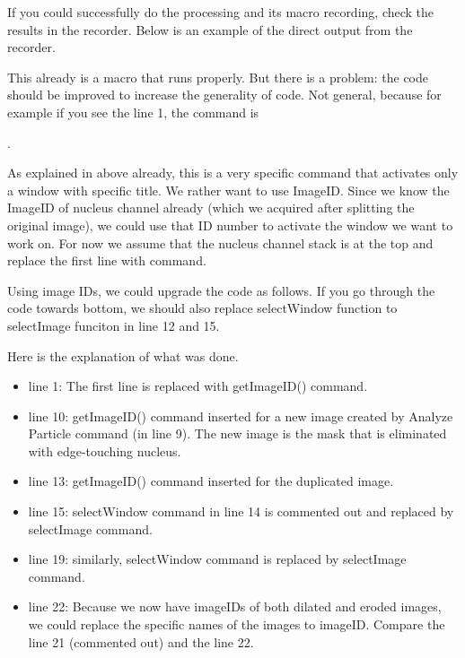 If you could successfully do the processing and its macro recording, check the results in the recorder. Below is an example of the direct output from the recorder. 



This already is a macro that runs properly. But there is a problem: the code should be improved to increase the generality of code. Not general, because for example if you see the line 1, the command is 

. 


As explained in above already, this is a very specific command that activates only a window with specific title. We rather want to use ImageID. Since we know the ImageID of nucleus channel already (which we acquired after splitting the original image), we could use that ID number to activate the window we want to work on. For now we assume that the nucleus channel stack is at the top and replace the first line with  command. 

Using image IDs, we could upgrade the code as follows.  If you go through the code towards bottom, we should also replace selectWindow function to selectImage funciton in line 12 and 15.




Here is the explanation of what was done. 
\begin{itemize}
  \item line 1: The first line is replaced with getImageID() command. 
  \item line 10: getImageID() command inserted for a new image created by Analyze Particle command (in line 9). The new image is the mask that is eliminated with edge-touching nucleus. 
  \item line 13: getImageID() command inserted for the duplicated image. 
  \item line 15: selectWindow command in line 14 is commented out and replaced by selectImage command. 
  \item line 19: similarly, selectWindow command is replaced by selectImage command. 
  \item line 22: Because we now have imageIDs of both dilated and eroded images, we could replace the specific names of the images to imageID. Compare the line 21 (commented out) and the line 22. 
\end{itemize}

